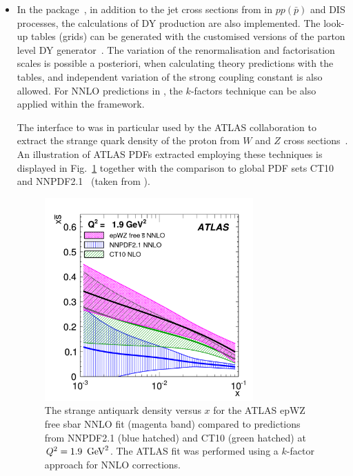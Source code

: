 \begin{itemize}
\item In the \applgrid package~\cite{Carli:2010rw,APPLGRID:HepForge},
    in addition to the jet cross sections from \nlojetpp 
    in $pp(\bar p)$ and DIS processes, the calculations 
    of DY production are also implemented. The look-up tables (grids) can be generated with
    the customised versions of the \mcfm parton level DY
    generator~\cite{Campbell:1999ah,Campbell:2000je,Campbell:2010ff}.  
    The variation of the renormalisation and factorisation scales is possible a posteriori,
    when calculating theory predictions with the \applgrid  tables, and
    independent variation of the strong coupling constant is also allowed.
    For NNLO predictions in \fitter, the $k$-factors technique can be also applied
    within the \applgrid framework.

    The \fitter interface to \applgrid was in particular used by the ATLAS
    collaboration to extract the strange quark density of the proton
    from $W$ and $Z$ cross sections~\cite{atlas:strange}. An
    illustration of ATLAS PDFs extracted employing these techniques
    is displayed in
    Fig.~\ref{fig:atlas} together with the comparison to global PDF
    sets CT10~\cite{CT10pdf} and NNPDF2.1~\cite{NNPDFpdf} (taken from \cite{atlas:strange}).

\begin{figure}[!ht]
  \centering
  \includegraphics[width=8cm]{atlas.pdf}
  \caption{The strange antiquark density versus $x$ for the ATLAS
    epWZ free sbar NNLO fit \cite{atlas:strange} (magenta band) compared to predictions
    from NNPDF2.1 (blue hatched) and CT10 (green hatched) 
    at $Q^2 = 1.9\ \,\text{Ge\hspace{-.08em}V}^2$. The ATLAS fit was performed using a $k$-factor approach 
    for NNLO corrections.}
  \label{fig:atlas}
\end{figure}


\end{itemize}
